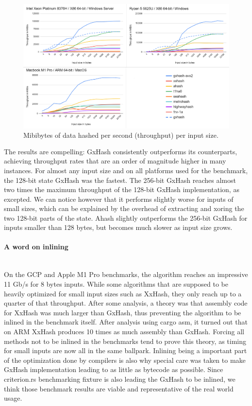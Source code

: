 \documentclass[10pt]{article}
\begin{document}
\begin{figure}[H]
\centering
\includegraphics[width=1\textwidth]{throughput.png}
\caption{Mibibytes of data hashed per second (throughput) per input size.}
\label{fig:benchmark-throughput}
\end{figure}

The results are compelling: GxHash consistently outperforms its counterparts, achieving throughput rates that are an order of magnitude higher in many instances. For almost any input size and on all platforms used for the benchmark, the 128-bit state GxHash was the fastest.
The 256-bit GxHash reaches almost two times the maximum throughput of the 128-bit GxHash implementation, as excepted. We can notice however that it performs slightly worse for inputs of small sizes, which can be explained by the overhead of extracting and xoring the two 128-bit parts of the state. Ahash slightly outperforms the 256-bit GxHash for inputs smaller than 128 bytes, but becomes much slower as input size grows.

\paragraph{A word on inlining}\leavevmode\\
On the GCP and Apple M1 Pro benchmarks, the algorithm reaches an impressive 11 Gb/s for 8 bytes inputs. While some algorithms that are supposed to be heavily optimized for small input sizes such as XxHash, they only reach up to a quarter of that throughput. After some analysis, a theory was that assembly code for XxHash was much larger than GxHash, thus preventing the algorithm to be inlined in the benchmark itself. After analysis using cargo asm, it turned out that on ARM XxHash produces 10 times as much assembly than GxHash. Forcing all methods not to be inlined in the benchmarks tend to prove this theory, as timing for small inputs are now all in the same ballpark. Inlining being a important part of the optimization done by compilers is also why special care was taken to make GxHash implementation leading to as little as bytecode as possible. Since criterion.rs benchmarking fixture is also leading the GxHash to be inlined, we think those benchmark results are viable and representative of the real world usage.
\end{document}
